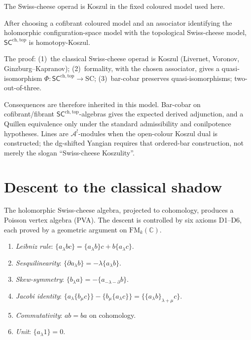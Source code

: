 \documentclass[11pt]{article}
\newcommand{\cA}{\mathcal{A}}
\newcommand{\C}{\mathbb{C}}
\newcommand{\SCchtop}{\mathsf{SC}^{\mathrm{ch,top}}}
\newcommand{\FM}{\mathrm{FM}}
\begin{document}
The Swiss-cheese operad is Koszul in the fixed coloured model
used here.

\begin{theorem}
\label{thm:homotopy-koszul-wn}
After choosing a cofibrant coloured model and an associator
identifying the holomorphic configuration-space model with the
topological Swiss-cheese model, $\SCchtop$ is homotopy-Koszul.
\end{theorem}

\noindent
The proof:
(1)~the classical Swiss-cheese operad is Koszul
(Livernet, Voronov, Ginzburg--Kapranov);
(2)~formality, with the chosen associator, gives a quasi-isomorphism
$\Phi\colon \SCchtop \to \mathrm{SC}$;
(3)~bar-cobar preserves quasi-isomorphisms; two-out-of-three.

Consequences are therefore inherited in this model.  Bar-cobar on
cofibrant/fibrant $\SCchtop$-algebras gives the expected derived
adjunction, and a Quillen equivalence only under the standard
admissibility and conilpotence hypotheses.  Lines are
$\cA^!$-modules when the open-colour Koszul dual is constructed;
the dg-shifted Yangian requires that ordered-bar construction, not
merely the slogan ``Swiss-cheese Koszulity''.


\section{Descent to the classical shadow}
\label{sec:pva-descent}

The holomorphic Swiss-cheese algebra, projected to cohomology,
produces a Poisson vertex algebra (PVA).  The descent is
controlled by six axioms D1--D6, each proved by a geometric
argument on $\FM_k(\C)$.

\begin{enumerate}[label=D\arabic*.,nosep]
\item \textit{Leibniz rule}:
  $\{a_\lambda bc\} = \{a_\lambda b\}c + b\{a_\lambda c\}$.
\item \textit{Sesquilinearity}:
  $\{\partial a_\lambda b\} = -\lambda\{a_\lambda b\}$.
\item \textit{Skew-symmetry}:
  $\{b_\lambda a\} = -\{a_{-\lambda-\partial} b\}$.
\item \textit{Jacobi identity}:
  $\{a_\lambda\{b_\mu c\}\} - \{b_\mu\{a_\lambda c\}\}
  = \{\{a_\lambda b\}_{\lambda+\mu} c\}$.
\item \textit{Commutativity}:
  $ab = ba$ on cohomology.
\item \textit{Unit}:
  $\{a_\lambda 1\} = 0$.
\end{enumerate}
\end{document}
